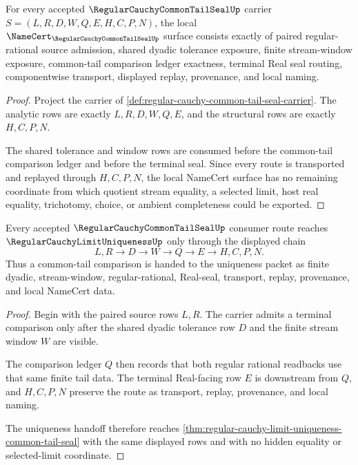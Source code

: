 \begin{theorem}
\label{thm:regular-cauchy-common-tail-seal-namecert-obligations}
For every accepted $\RegularCauchyCommonTailSealUp$ carrier $S=(L,R,D,W,Q,E,H,C,P,N)$, the local $\NameCert_{\RegularCauchyCommonTailSealUp}$ surface consists exactly of paired regular-rational source admission, shared dyadic tolerance exposure, finite stream-window exposure, common-tail comparison ledger exactness, terminal Real seal routing, componentwise transport, displayed replay, provenance, and local naming.
\end{theorem}
\begin{proof}
Project the carrier of \autoref{def:regular-cauchy-common-tail-seal-carrier}. The analytic rows are exactly $L,R,D,W,Q,E$, and the structural rows are exactly $H,C,P,N$.

The shared tolerance and window rows are consumed before the common-tail comparison ledger and before the terminal seal. Since every route is transported and replayed through $H,C,P,N$, the local NameCert surface has no remaining coordinate from which quotient stream equality, a selected limit, host real equality, trichotomy, choice, or ambient completeness could be exported.
\end{proof}

\begin{theorem}
\label{thm:regular-cauchy-common-tail-seal-common-tail-handoff}
Every accepted $\RegularCauchyCommonTailSealUp$ consumer route reaches $\RegularCauchyLimitUniquenessUp$ only through the displayed chain
$$
L,R \to D \to W \to Q \to E \to H,C,P,N .
$$
Thus a common-tail comparison is handed to the uniqueness packet as finite dyadic, stream-window, regular-rational, Real-seal, transport, replay, provenance, and local NameCert data.
\end{theorem}
\begin{proof}
Begin with the paired source rows $L,R$. The carrier admits a terminal comparison only after the shared dyadic tolerance row $D$ and the finite stream window $W$ are visible.

The comparison ledger $Q$ then records that both regular rational readbacks use that same finite tail data. The terminal Real-facing row $E$ is downstream from $Q$, and $H,C,P,N$ preserve the route as transport, replay, provenance, and local naming.

The uniqueness handoff therefore reaches \autoref{thm:regular-cauchy-limit-uniqueness-common-tail-seal} with the same displayed rows and with no hidden equality or selected-limit coordinate.
\end{proof}

